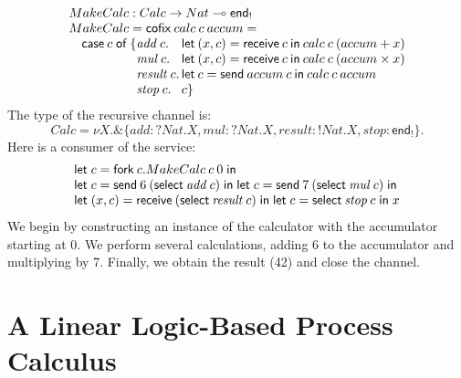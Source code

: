 \documentclass[orivec,envcountsame]{llncs}
\makeatletter
\newcommand{\with}{\mathbin\binampersand}
\newcommand{\gvout}[2]{{!#1.#2}}
\newcommand{\gvin}[2]{{?#1.#2}}
\newcommand{\lto}{\ensuremath{\multimap}}
\newcommand{\uto}{\ensuremath{\rightarrow}}
\newcommand{\outterm}{\mkwd{end}_!}
\newcommand{\interm}{\mkwd{end}_?}
\newcommand{\mkwd}[1]{\mathsf{#1}}
\newcommand{\tkwd}[1]{\textsf{#1}}
\newcommand{\clabel}[1]{\mathit{#1}}
\newcommand{\gvsend}[2]{\mkwd{send}\:#1\:#2}
\newcommand{\gvreceive}[1]{\mkwd{receive}\:#1}
\newcommand{\gvlet}[3]{\mkwd{let}\;#1 = #2\;\mkwd{in}\;#3}
\newcommand{\gvselect}[2]{\mkwd{select}\:#1\:#2}
\newcommand{\gvfork}[2]{\mkwd{fork}\:#1.#2}
\newcommand{\lrkwd}{\mkwd{cofix}}
\newcommand{\ba}{\begin{array}}
\newcommand{\ea}{\end{array}}
\newcommand{\bl}{\ba[t]{@{}l@{}}}
\newcommand{\el}{\ea}
\makeatother
\begin{document}
\small\[
\bl
MakeCalc : Calc \uto Nat \lto \outterm \\
MakeCalc = \lrkwd\:calc\:c\:accum = \\
\quad
  \bl
  \mkwd{case}\:c\;\mkwd{of}\:\{
    \ba[t]{@{}l@{}l@{}}
    \clabel{add}\:c.
      & \,\mkwd{let}\:(x,c) = \gvreceive{c} \: \mkwd{in}\:
      calc\:c\:(accum + x) \\
    \clabel{mul}\:c.
      & \,\mkwd{let}\:(x,c) = \gvreceive{c}\:\mkwd{in}\:
      calc\:c\:(accum \times x) \\
    \clabel{result}\:c.
      & \,\mkwd{let}\:c = \gvsend{accum}{c}\:\mkwd{in}\:
        calc\:c\:accum \\
    \clabel{stop}\:c.& \, c \}
    \ea \\
  \el \\
\el
\]\normalsize
The type of the recursive channel is:
\small\[
 Calc = \nu X. \with \{ \clabel{add}: \gvin{Nat}{X},
                        \clabel{mul}: \gvin{Nat}{X},
                        \clabel{result}: \gvout{Nat}{X},
                        \clabel{stop}: \outterm \}.
\]\normalsize%
Here is a consumer of the service:
\small\[
\bl
  \gvlet{c}{\gvfork{c}{MakeCalc\:c\:0}}{} \\
  \gvlet{c}{\gvsend{6}{(\gvselect{\clabel{add}}{c})}}{
  \gvlet{c}{\gvsend{7}{(\gvselect{\clabel{mul}}{c})}}{}} \\
  \gvlet{(x,c)}{\gvreceive{(\gvselect{\clabel{result}}{c})}}{
  \gvlet{c}{\gvselect{\clabel{stop}}{c}}{x}}
\el
\]\normalsize
We begin by constructing an instance of the calculator with the accumulator starting at 0. %
We perform several calculations, adding 6 to the accumulator and multiplying by 7.  Finally, we
obtain the result (42) and close the channel.

\section{A Linear Logic-Based Process Calculus}\label{sec:mucp}

\end{document}
